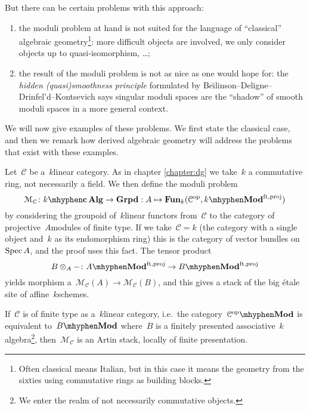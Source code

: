 \begin{refsection}
But there can be certain problems with this approach:
\begin{enumerate}
  \item the moduli problem at hand is not suited for the language of ``classical'' algebraic geometry\footnote{Often classical means Italian, but in this case it means the geometry from the sixties using commutative rings as building blocks.}: more difficult objects are involved, we only consider objects up to quasi-isomorphism, \dots;
  \item the result of the moduli problem is not as nice as one would hope for: the \emph{hidden (quasi)smoothness principle} formulated by Be\u\i linson--Deligne--Drinfel'd--Kontsevich says singular moduli spaces are the ``shadow'' of smooth moduli spaces in a more general context.
\end{enumerate}
We will now give examples of these problems. We first state the classical case, and then we remark how derived algebraic geometry will address the problems that exist with these examples.
\begin{example}
  Let~$\mathcal{C}$ be a~$k$\dash linear category. As in chapter \ref{chapter:dg} we take~$k$ a commutative ring, not necessarily a field. We then define the moduli problem
  \begin{equation}
    \mathcal{M}_{\mathcal{C}}\colon k\mhyphen\mathbf{c\,Alg}\to\mathbf{Grpd}:A\mapsto\Fun_k(\mathcal{C}^\opp,k\mhyphen\Mod^{\mathrm{ft,proj}})
  \end{equation}
  by considering the groupoid of~$k$\dash linear functors from~$\mathcal{C}$ to the category of projective~$A$\dash modules of finite type. If we take~$\mathcal{C}=k$ (the category with a single object and~$k$ as its endomorphism ring) this is the category of vector bundles on~$\operatorname{Spec} A$, and the proof uses this fact. The tensor product
  \begin{equation}
    B\otimes_A-\colon A\mhyphen\Mod^{\mathrm{ft,proj}}\to B\mhyphen\Mod^{\mathrm{ft,proj}}
  \end{equation}
  yields morphism a~$\mathcal{M}_{\mathcal{C}}(A)\to\mathcal{M}_{\mathcal{C}}(B)$, and this gives a stack of the big \'etale site of affine~$k$\dash schemes.

  If~$\mathcal{C}$ is of finite type as a~$k$\dash linear category, i.e.\ the category~$\mathcal{C}^\opp\mhyphen\Mod$ is equivalent to~$B\mhyphen\Mod$ where~$B$ is a finitely presented associative~$k$\dash algebra\footnote{We enter the realm of not necessarily commutative objects.}, then~$\mathcal{M}_{\mathcal{C}}$ is an Artin stack, locally of finite presentation.


\end{example}
\end{refsection}
